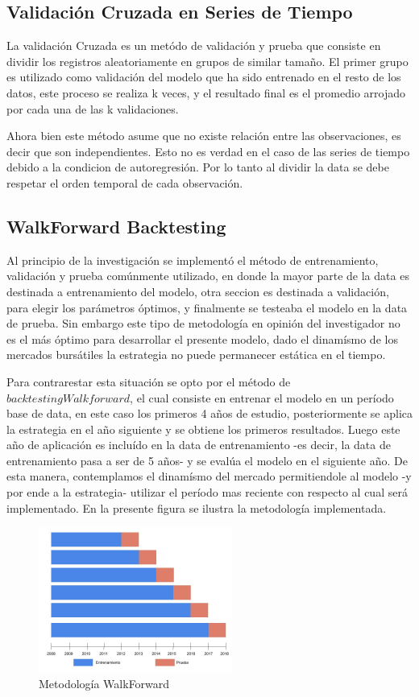 \documentclass[a4paper,12pt]{Latex/Classes/PhDthesisPSnPDF}
\begin{document}
\subsection{Validación Cruzada en Series de Tiempo}

La validación Cruzada es un metódo de validación y prueba que consiste en dividir los registros aleatoriamente en grupos de similar tamaño. El primer grupo es utilizado como validación del modelo que ha sido entrenado en el resto de los datos, este proceso se realiza k veces, y el resultado final es el promedio arrojado por cada una de las k validaciones.

Ahora bien este método asume que no existe relación entre las observaciones, es decir que son independientes. Esto no es verdad en el caso de las series de tiempo debido a la condicion de autoregresión. Por lo tanto al dividir la data se debe respetar el orden temporal de cada observación. 

\subsection{WalkForward Backtesting}

Al principio de la investigación se implementó el método de entrenamiento, validación y prueba comúnmente utilizado, en donde la mayor parte de la data es destinada a entrenamiento del modelo, otra seccion es destinada a validación, para elegir los parámetros óptimos, y finalmente se testeaba el modelo en la data de prueba. Sin embargo este tipo de metodología en opinión del investigador no es el más óptimo para desarrollar el presente modelo, dado el dinamísmo de los mercados bursátiles la estrategia no puede permanecer estática en el tiempo.

Para contrarestar esta situación se opto por el método de $backtesting Walkforward$, el cual consiste en entrenar el modelo en un período base de data, en este caso los primeros 4 años de estudio, posteriormente se aplica la estrategia en el año siguiente y se obtiene los primeros resultados. Luego este año de aplicación es incluído en la data de entrenamiento -es decir, la data de entrenamiento pasa a ser de 5 años- y se evalúa el modelo en el siguiente año. De esta manera, contemplamos el dinamísmo del mercado permitiendole al modelo -y por ende a la estrategia- utilizar el período mas reciente con respecto al cual será implementado. En la presente figura se ilustra la metodología implementada.

\begin{figure}[ht]
\begin{center}
\includegraphics[width=2.5in]{images/walkforward_plot}
\end{center}
\caption{Metodología WalkForward}
\end{figure}
\end{document}
